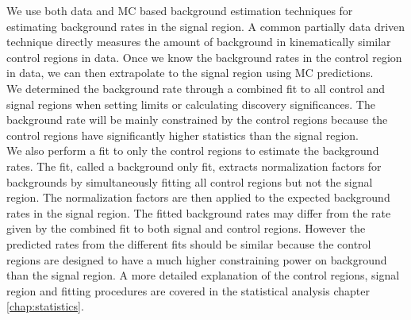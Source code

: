 \indent We use both data and MC based background estimation techniques for estimating background rates in the signal region.  A common partially data driven technique directly measures the amount of background in kinematically similar control regions in data.  Once we know the background rates in the control region in data, we can then extrapolate to the signal region using MC predictions. \\

\indent We determined the background rate through a combined fit to all control and signal regions when setting limits or calculating discovery significances.  The background rate will be mainly constrained by the control regions because the control regions have significantly higher statistics than the signal region.  \\

\indent We also perform a fit to only the control regions to estimate the background rates.  The fit, called a background only fit, extracts normalization factors for backgrounds by simultaneously fitting all control regions but not the signal region.  The normalization factors are then applied to the expected background rates in the signal region.  The fitted background rates may differ from the rate given by the combined fit to both signal and control regions. However the predicted rates from the different fits should be similar because the control regions are designed to have a much higher constraining power on background than the signal region.  A more detailed explanation of the control regions, signal region and fitting procedures are covered in the statistical analysis chapter \ref{chap:statistics}.  \\




